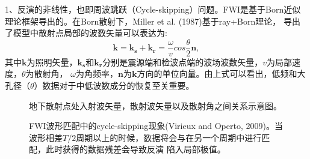 1、反演的非线性，也即周波跳跃（Cycle-skipping）问题。FWI是基于Born近似理论框架导出的。在Born散射下，Miller et
al. (1987)\cite{MillerEtAl1987}基于ray+Born理论，
导出了模型中散射点局部的波数矢量可以表达为:
\begin{equation}
    \mathbf{k}=\mathbf{k_s}+\mathbf{k_r}=\frac{\omega}{v}cos\frac{\theta}{2}\mathbf{n},
    \label{eq:Modelwnb}
\end{equation}
其中$\mathbf{k}$为照明矢量，$\mathbf{k_s}$和$\mathbf{k_r}$分别是震源端和检波点端的波场波数矢量，$v$为局部速度，$\theta$为散射角，
$\omega$为角频率，$\mathbf{n}$为$\mathbf{k}$方向的单位向量。由上式可以看出，低频和大孔径（$\theta$）数据对于中低波数成分的恢复至关重要。
\begin{figure}[!htb] 
   \centering 
   \caption{地下散射点处入射波矢量，散射波矢量以及散射角之间关系示意图。}
   \label{fig:WavenumberVector}
\end{figure}
\begin{figure}[!htb] 
   \centering 
   \caption{FWI波形匹配中的cycle-skipping现象(Virieux and Operto,
	   2009\cite{virieux2009overview})。当波形相差$T/2$周期以上的时候，数据将会与在另一个周期中进行匹配，此时获得的数据残差会导致反演
   陷入局部极值。}
   \label{fig:Cycleskipping}
\end{figure}
